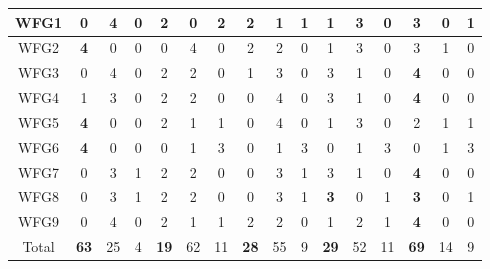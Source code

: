 \begin{table}[h]
{\begin{tabular}{|c|c|c|c|c|c|c|c|c|c|c|c|c|c|c|c|}
WFG1 & 0 & 4 & 0 & 2 & 0 & 2 & 2 & 1 & 1 & 1 & 3 & 0 & \textbf{3} & 0 & 1 \\ \hline
WFG2 & \textbf{4} & 0 & 0 & 0 & 4 & 0 & 2 & 2 & 0 & 1 & 3 & 0 & 3 & 1 & 0 \\ \hline
WFG3 & 0 & 4 & 0 & 2 & 2 & 0 & 1 & 3 & 0 & 3 & 1 & 0 & \textbf{4} & 0 & 0 \\ \hline
WFG4 & 1 & 3 & 0 & 2 & 2 & 0 & 0 & 4 & 0 & 3 & 1 & 0 & \textbf{4} & 0 & 0 \\ \hline
WFG5 & \textbf{4} & 0 & 0 & 2 & 1 & 1 & 0 & 4 & 0 & 1 & 3 & 0 & 2 & 1 & 1 \\ \hline
WFG6 & \textbf{4} & 0 & 0 & 0 & 1 & 3 & 0 & 1 & 3 & 0 & 1 & 3 & 0 & 1 & 3 \\ \hline
WFG7 & 0 & 3 & 1 & 2 & 2 & 0 & 0 & 3 & 1 & 3 & 1 & 0 & \textbf{4} & 0 & 0 \\ \hline
WFG8 & 0 & 3 & 1 & 2 & 2 & 0 & 0 & 3 & 1 & \textbf{3} & 0 & 1 & \textbf{3} & 0 & 1 \\ \hline
WFG9 & 0 & 4 & 0 & 2 & 1 & 1 & 2 & 2 & 0 & 1 & 2 & 1 & \textbf{4} & 0 & 0 \\ \hline
Total & \textbf{63} & 25 & 4 & \textbf{19} & 62 & 11 & \textbf{28} & 55 & 9 & \textbf{29} & 52 & 11 & \textbf{69} & 14 & 9 \\ \hline
\end{tabular}%
}
\end{table}


